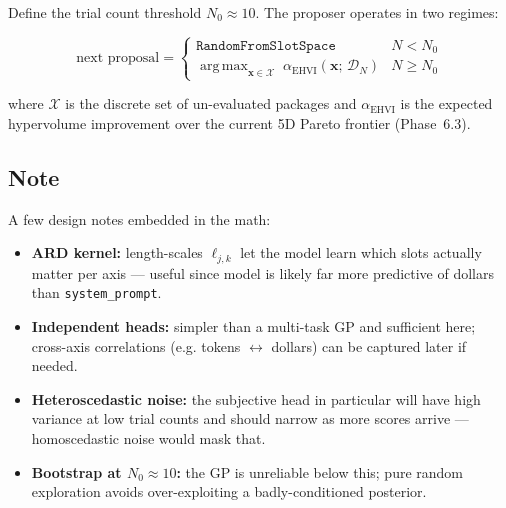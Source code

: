 \documentclass[11pt, letterpaper]{article}
\theoremstyle{definition}
\DeclareMathOperator*{\argmax}{arg\,max}
\begin{document}
Define the trial count threshold $N_0 \approx 10$.  The proposer operates
in two regimes:

\[
  \text{next proposal} =
  \begin{cases}
    \texttt{RandomFromSlotSpace} & N < N_0 \\[4pt]
    \argmax_{\bm{x} \in \mathcal{X}}
      \;\alpha_{\mathrm{EHVI}}\!\left(\bm{x};\,\mathcal{D}_N\right)
    & N \geq N_0
  \end{cases}
\]

where $\mathcal{X}$ is the discrete set of un-evaluated packages and
$\alpha_{\mathrm{EHVI}}$ is the expected hypervolume improvement over the
current 5D Pareto frontier (Phase~6.3).

\subsection*{Note}

A few design notes embedded in the math:

\begin{itemize}
  \item \textbf{ARD kernel:} length-scales $\ell_{j,k}$ let the model learn which slots
  actually matter per axis — useful since model is likely far more
  predictive of dollars than \texttt{system\_prompt}.
  \item \textbf{Independent heads:} simpler than a multi-task GP and sufficient
  here; cross-axis correlations (e.g. tokens $\leftrightarrow$ dollars) can be
  captured later if needed.
  \item \textbf{Heteroscedastic noise:} the subjective head in particular will have
  high variance at low trial counts and should narrow as more scores
  arrive — homoscedastic noise would mask that. 
  \item \textbf{Bootstrap at $N_0 \approx 10$:} the GP is unreliable below this; pure random
  exploration avoids over-exploiting a badly-conditioned posterior.
\end{itemize}
\end{document}
